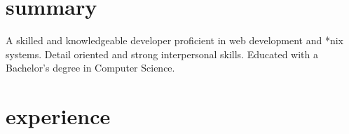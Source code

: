 \documentclass[]{cv-style} %
\begin{document}
\section{summary}

A skilled and knowledgeable developer proficient in web development and *nix systems. Detail oriented and strong interpersonal skills. Educated with a Bachelor's degree in Computer Science.


\section{experience}

%
%
%
%
\end{document}
